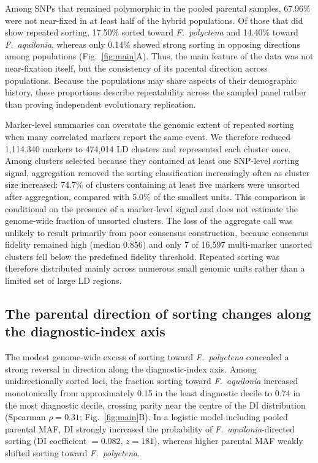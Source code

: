 \documentclass[11pt]{article}
\newcommand{\Faq}{\textit{F.~aquilonia}}
\newcommand{\Fpo}{\textit{F.~polyctena}}
\begin{document}
Among SNPs that remained polymorphic in the pooled parental samples, 67.96\%
were not near-fixed in at least half of the hybrid populations. Of those that
did show repeated sorting, 17.50\% sorted toward \Fpo{} and 14.40\% toward
\Faq{}, whereas only 0.14\% showed strong sorting in opposing directions among
populations (Fig.~\ref{fig:main}A). Thus, the main feature of the data was not
near-fixation itself, but the consistency of its parental direction across
populations. Because the populations may share aspects of their demographic
history, these proportions describe repeatability across the sampled panel
rather than proving independent evolutionary replication.

Marker-level summaries can overstate the genomic extent of repeated sorting
when many correlated markers report the same event. We therefore reduced
1,114,340 markers to 474,014 LD clusters and represented each cluster once.
Among clusters selected because they contained at least one SNP-level sorting
signal, aggregation removed the sorting classification increasingly often as
cluster size increased: 74.7\% of clusters containing at least five markers
were unsorted after aggregation, compared with 5.0\% of the smallest units.
This comparison is conditional on the presence of a marker-level signal and
does not estimate the genome-wide fraction of unsorted clusters. The loss of
the aggregate call was unlikely to result primarily from poor consensus
construction, because consensus fidelity remained high (median 0.856) and only
7 of 16,597 multi-marker unsorted clusters fell below the predefined fidelity
threshold. Repeated sorting was therefore distributed mainly across numerous
small genomic units rather than a limited set of large LD regions.

\subsection*{The parental direction of sorting changes along the diagnostic-index axis}

The modest genome-wide excess of sorting toward \Fpo{} concealed a strong
reversal in direction along the diagnostic-index axis. Among
unidirectionally sorted loci, the fraction sorting toward \Faq{} increased
monotonically from approximately 0.15 in the least diagnostic decile to 0.74
in the most diagnostic decile, crossing parity near the centre of the DI
distribution (Spearman \(\rho=0.31\); Fig.~\ref{fig:main}B). In a logistic model
including pooled parental MAF, DI strongly increased the probability of
\Faq-directed sorting (DI coefficient \(=0.082\), \(z=181\)), whereas higher
parental MAF weakly shifted sorting toward \Fpo{}.
\end{document}
